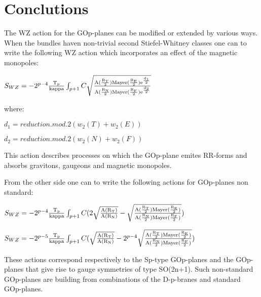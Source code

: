 \documentclass[a4paper,a4paper]{article}
\begin{document}
\section{Conclutions}

The WZ action for the GOp-planes can be modified or extended by various ways.
When the bundles haven non-trivial second Stiefel-Whitney classes one can to write the following WZ action which incorporates an effect of the magnetic monopoles:

\begin{center}
{  $ S_{WZ} = -2^{p-4}\frac{\rm T_p}{\rm kappa}\int_{p+1} C\sqrt{\frac{\rm A(\frac{\rm R_T}{\rm 2})Mayer(\frac{\rm R_E}{\rm 2})e^{\frac{\rm d_1}{\rm 2}}}{\rm A(\frac{\rm R_N}{\rm 2})Mayer(\frac{\rm R_F}{\rm 2})e^{\frac{\rm d_2}{\rm 2}}}}$ }
\end{center}

where:

\begin{center}
{  $ d_1 = reduction.mod.2(w_2(T)+w_2(E))$ }
\end{center}

\begin{center}
{  $ d_2 = reduction.mod.2(w_2(N)+w_2(F))$ }
\end{center}

This action describes processes on which the GOp-plane emites RR-forms and absorbs gravitons, gaugeons and magnetic monopoles.

From the other side one can to write the following actions for GOp-planes non 
standard:

\begin{center}
{  $ S_{WZ} = -2^{p-4}\frac{\rm T_p}{\rm kappa}\int_{p+1} C(2\sqrt{\frac{\rm A(R_T)}{\rm A(R_N)}}-\sqrt{\frac{\rm A(\frac{\rm R_T}{\rm 2})Mayer(\frac{\rm R_E}{\rm 2})}{\rm A(\frac{\rm R_N}{\rm 2})Mayer(\frac{\rm R_F}{\rm 2})}})$ }
\end{center}

\begin{center}
{  $ S_{WZ} = -2^{p-5}\frac{\rm T_p}{\rm kappa}\int_{p+1} C(\sqrt{\frac{\rm A(R_T)}{\rm A(R_N)}}-2^{p-4}\sqrt{\frac{\rm A(\frac{\rm R_T}{\rm 2})Mayer(\frac{\rm R_E}{\rm 2})}{\rm A(\frac{\rm R_N}{\rm 2})Mayer(\frac{\rm R_F}{\rm 2})}})$ }
\end{center}

These actions correspond respectively to the Sp-type GOp-planes and the GOp-planes that give rise to gauge symmetries of type SO(2n+1).  Such non-standard GOp-planes are building from combinations of the D-p-branes and standard GOp-planes.
\end{document}
